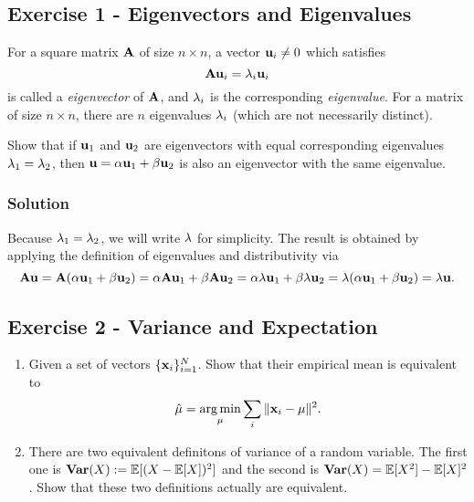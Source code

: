 \documentclass[
  letterpaper,
  DIV=11,
  numbers=noendperiod]{scrartcl}
\author{}
\date{}
\begin{document}
\subsection{Exercise 1 - Eigenvectors and
Eigenvalues}\label{exercise-1---eigenvectors-and-eigenvalues}

For a square matrix \(\mathbf{A}\) of size \(n \times n\), a vector
\(\mathbf{u}_i \neq 0\) which satisﬁes \begin{equation}
\mathbf{A}\mathbf{u}_i = \lambda_i \mathbf{u}_i
\label{eq:eigen}
\end{equation} is called a \emph{eigenvector} of \(\mathbf{A}\), and \(\lambda_i\)
is the corresponding \emph{eigenvalue}. For a matrix of size
\(n \times n\), there are \(n\) eigenvalues \(\lambda_i\) (which are not
necessarily distinct).

Show that if \(\mathbf{u}_1\) and \(\mathbf{u}_2\) are eigenvectors with equal
corresponding eigenvalues \(\lambda_1 = \lambda_2\), then
\(\mathbf{u} = \alpha \mathbf{u}_1 + \beta \mathbf{u}_2\) is also an eigenvector with the same
eigenvalue.

\subsubsection{Solution}\label{solution}

Because \(\lambda_1=\lambda_2\), we will write \(\lambda\) for simplicity. The
result is obtained by applying the definition of eigenvalues and
distributivity via \begin{equation*}
\mathbf{A}\mathbf{u} 
  = \mathbf{A} (\alpha \mathbf{u}_1 + \beta \mathbf{u}_2) 
  =   \alpha \mathbf{A} \mathbf{u}_1 + \beta \mathbf{A} \mathbf{u}_2
  =   \alpha \lambda \mathbf{u}_1 + \beta \lambda \mathbf{u}_2
  =   \lambda (\alpha\mathbf{u}_1 + \beta \mathbf{u}_2)
  =   \lambda \mathbf{u} .
\end{equation*}

\subsection{Exercise 2 - Variance and
Expectation}\label{exercise-2---variance-and-expectation}

\begin{enumerate}
\def\labelenumi{(\alph{enumi})}
\item
  Given a set of vectors \(\{\mathbf{x}_i\}_{i=1}^N\). Show that their
  empirical mean is equivalent to
  \[\hat{\mu}=\operatorname*{arg\,min}_{\mathbf{\mu}} \sum_i \|\mathbf{x}_i - \mathbf{\mu}\|^2.\]
\item
  There are two equivalent definitons of variance of a random variable.
  The first one is \(\mathbf{Var}(X) := \mathbb{E}[(X - \mathbb{E}[X])^2]\) and the second is
  \(\mathbf{Var}(X) = \mathbb{E}[X^2] - \mathbb{E}[X]^2\). Show that these two definitions
  actually are equivalent.
\end{enumerate}
\end{document}
